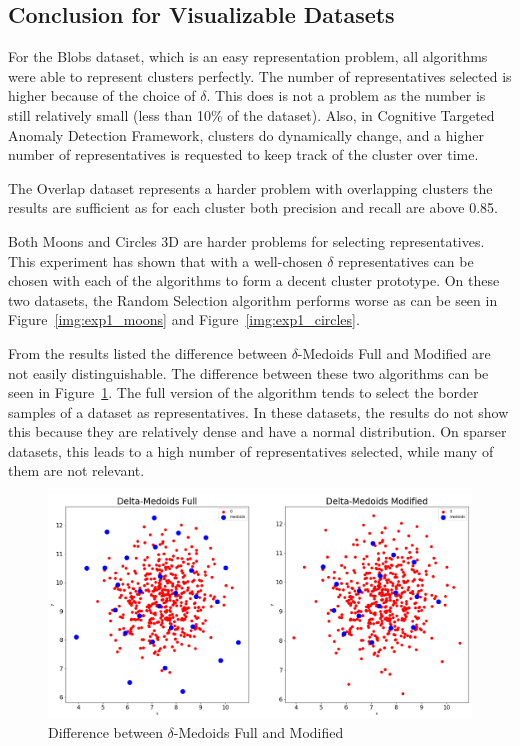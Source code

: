 \documentclass[thesis=B,english]{FITthesis}[2012/10/20]
\begin{document}
\subsection{Conclusion for Visualizable Datasets}
For the Blobs dataset, which is an easy representation problem, all algorithms were able to represent clusters perfectly.
The number of representatives selected is higher because of the choice of $\delta$.
This does is not a problem as the number is still relatively small (less than 10\% of the dataset).
Also, in Cognitive Targeted Anomaly Detection Framework, clusters do dynamically change, and a higher number of representatives is requested to keep track of the cluster over time.

The Overlap dataset represents a harder problem with overlapping clusters the results are sufficient as for each cluster both precision and recall are above 0.85.

Both Moons and Circles 3D are harder problems for selecting representatives.
This experiment has shown that with a well-chosen $\delta$ representatives can be chosen with each of the algorithms to form a decent cluster prototype.
On these two datasets, the Random Selection algorithm performs worse as can be seen in Figure~\ref{img:exp1_moons} and Figure~\ref{img:exp1_circles}.

From the results listed the difference between $\delta$-Medoids Full and Modified are not easily distinguishable.
The difference between these two algorithms can be seen in Figure~\ref{img:difference_modified}.
The full version of the algorithm tends to select the border samples of a dataset as representatives.
In these datasets, the results do not show this because they are relatively dense and have a normal distribution.
On sparser datasets, this leads to a high number of representatives selected, while many of them are not relevant.

\begin{figure}[t]
   \includegraphics[width=\linewidth]{img/delta_medoids_select.png}
  \caption{Difference between $\delta$-Medoids Full and Modified}
  \label{img:difference_modified}
\end{figure}
\end{document}
